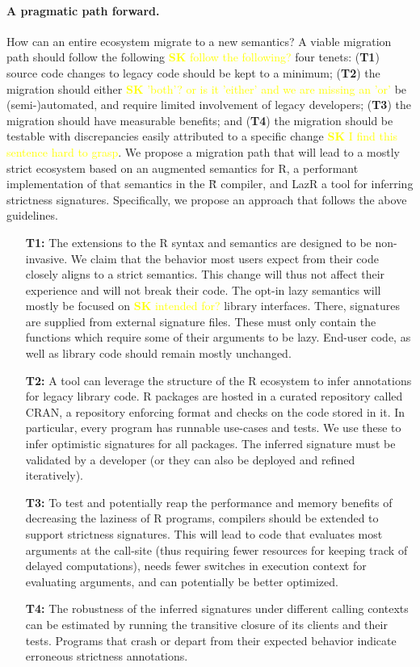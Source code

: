 \documentclass[review,nonacm,screen,acmsmall,anonymous=true]{acmart}
\newcommand{\authorcomment}[3]{\xspace\textcolor{#1}{{\bf #2} #3}\xspace}
\newcommand{\SK}[1]{\authorcomment{yellow}{SK}{#1}}
\newcommand{\lazr}{{\sf LazR}\xspace}
\renewcommand{\Rsh}{{\sf\u R}\xspace}
\begin{document}
\paragraph{A pragmatic path forward.} How can an entire ecosystem migrate to
a new semantics? A viable migration path should follow the following \SK{follow the following?} four
tenets: ({\bf T1}) source code changes to legacy code should be kept to a
minimum; ({\bf T2}) the migration should either \SK{'both'? or is it 'either' and we are missing an 'or'} be (semi-)automated, and require
limited involvement of legacy developers; ({\bf T3}) the migration should have
measurable benefits; and ({\bf T4}) the migration should be testable with
discrepancies easily attributed to a specific change \SK{I find this sentence hard to grasp}.
%
%
We propose a migration path that will lead to a mostly strict ecosystem based on
an augmented semantics for R, a performant implementation of that semantics in
the \Rsh compiler, and \lazr a tool for inferring strictness signatures.
Specifically, we propose an approach that follows the above guidelines.
\begin{itemize}
\item[{\bf T1:}] The extensions to the R syntax and semantics are designed to
  be non-invasive. We claim that the behavior most users expect from their
  code closely aligns to a strict semantics. This change will thus not affect
  their experience and will not break their code. The opt-in lazy semantics will
  mostly be focused on \SK{intended for?} library interfaces. There, signatures are supplied from
  external signature files. These must only contain the functions which require
  some of their arguments to be lazy. End-user code, as well as library code should
  remain mostly unchanged.
\item[{\bf T2:}] A tool can leverage the structure of the R ecosystem to infer
  annotations for legacy library code. R packages are hosted in a curated
  repository called CRAN, a repository enforcing format and checks on the code
  stored in it. In particular, every program has runnable use-cases and tests.
  We use these to infer optimistic signatures for all packages. The inferred
  signature must be validated by a developer (or they can also be deployed and
  refined iteratively).
\item[{\bf T3:}] To test and potentially reap the performance and memory benefits of decreasing
  the laziness of R programs, compilers should be extended to
  support strictness signatures. This will lead to code that evaluates most
  arguments at the call-site (thus requiring fewer resources for keeping track
  of delayed computations), needs fewer switches in execution context for
  evaluating arguments, and can potentially be better optimized.
\item[{\bf T4:}] The robustness of the inferred signatures under different
  calling contexts can be estimated by running the transitive closure
  of its clients and their tests. Programs that crash or depart from their
  expected behavior indicate erroneous strictness annotations.
\end{itemize}
\end{document}
